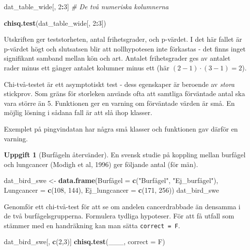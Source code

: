 \documentclass[
]{book}
\newenvironment{Shaded}{\begin{snugshade}}{\end{snugshade}}
\newcommand{\AttributeTok}[1]{\textcolor[rgb]{0.13,0.29,0.53}{#1}}
\newcommand{\CommentTok}[1]{\textcolor[rgb]{0.56,0.35,0.01}{\textit{#1}}}
\newcommand{\DecValTok}[1]{\textcolor[rgb]{0.00,0.00,0.81}{#1}}
\newcommand{\FunctionTok}[1]{\textcolor[rgb]{0.13,0.29,0.53}{\textbf{#1}}}
\newcommand{\NormalTok}[1]{#1}
\newcommand{\OtherTok}[1]{\textcolor[rgb]{0.56,0.35,0.01}{#1}}
\newcommand{\SpecialCharTok}[1]{\textcolor[rgb]{0.81,0.36,0.00}{\textbf{#1}}}
\newcommand{\StringTok}[1]{\textcolor[rgb]{0.31,0.60,0.02}{#1}}
\theoremstyle{definition}
\theoremstyle{definition}
\theoremstyle{definition}
\newtheorem{exercise}{Uppgift}[chapter]
\theoremstyle{definition}
\theoremstyle{remark}
\begin{document}
\begin{Shaded}
\begin{Highlighting}[]
\NormalTok{dat\_table\_wide[, }\DecValTok{2}\SpecialCharTok{:}\DecValTok{3}\NormalTok{] }\CommentTok{\# De två numeriska kolumnerna}

\FunctionTok{chisq.test}\NormalTok{(dat\_table\_wide[, }\DecValTok{2}\SpecialCharTok{:}\DecValTok{3}\NormalTok{])}
\end{Highlighting}
\end{Shaded}

Utskriften ger teststorheten, antal frihetsgrader, och p-värdet. I det här fallet är p-värdet högt och slutsatsen blir att nollhypotesen inte förkastas - det finns inget signifikant samband mellan kön och art. Antalet frihetsgrader ges av antalet rader minus ett gånger antalet kolumner minus ett (här \((2-1) \cdot (3-1) = 2\)).

Chi-två-testet är ett asymptotiskt test - dess egenskaper är beroende av \emph{stora} stickprov. Som gräns för storleken används ofta att samtliga förväntade antal ska vara större än 5. Funktionen ger en varning om förväntade värden är små. En möjlig lösning i sådana fall är att slå ihop klasser.

Exemplet på pingvindatan har några små klasser och funktionen gav därför en varning.

\begin{exercise}[Burfågeln återvänder]

En svensk studie på koppling mellan burfågel och lungcancer (Modigh et al, 1996) ger följande antal (för män).

\begin{Shaded}
\begin{Highlighting}[]
\NormalTok{dat\_bird\_swe }\OtherTok{\textless{}{-}} \FunctionTok{data.frame}\NormalTok{(Burfågel }\OtherTok{=} \FunctionTok{c}\NormalTok{(}\StringTok{"Burfågel"}\NormalTok{, }\StringTok{"Ej\_burfågel"}\NormalTok{),}
              \AttributeTok{Lungcancer =} \FunctionTok{c}\NormalTok{(}\DecValTok{108}\NormalTok{, }\DecValTok{144}\NormalTok{),}
              \AttributeTok{Ej\_lungcancer =} \FunctionTok{c}\NormalTok{(}\DecValTok{171}\NormalTok{, }\DecValTok{256}\NormalTok{))}
\NormalTok{dat\_bird\_swe}
\end{Highlighting}
\end{Shaded}

Genomför ett chi-två-test för att se om andelen cancerdrabbade än densamma i de två burfågelsgrupperna. Formulera tydliga hypoteser. För att få utfall som stämmer med en handräkning kan man sätta \texttt{correct\ =\ F}.

\begin{Shaded}
\begin{Highlighting}[]
\NormalTok{dat\_bird\_swe[, }\FunctionTok{c}\NormalTok{(}\DecValTok{2}\NormalTok{,}\DecValTok{3}\NormalTok{)]}
\FunctionTok{chisq.test}\NormalTok{(\_\_\_, }\AttributeTok{correct =}\NormalTok{ F)}
\end{Highlighting}
\end{Shaded}

\end{exercise}
\end{document}
